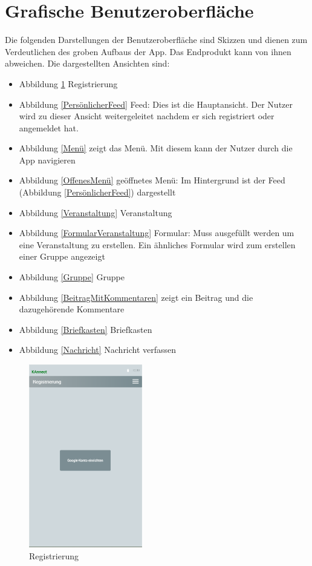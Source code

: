 \documentclass[parskip=full]{scrartcl}
\begin{document}
		
	\newpage
	\section{Grafische Benutzeroberfläche}
	Die folgenden Darstellungen der Benutzeroberfläche sind Skizzen und dienen zum Verdeutlichen des groben Aufbaus der \gls{App}. Das Endprodukt kann von ihnen abweichen.
	Die dargestellten Ansichten sind: 
	\begin{itemize}
		\item Abbildung \ref{Registrierung} Registrierung
		\item Abbildung \ref{PersönlicherFeed} \gls{Feed}: Dies ist die Hauptansicht. Der Nutzer wird zu dieser Ansicht weitergeleitet nachdem er sich registriert oder angemeldet hat.
		\item Abbildung \ref{Menü} zeigt das Menü. Mit diesem kann der Nutzer durch die \gls{App} navigieren
		\item Abbildung \ref{OffenesMenü} geöffnetes Menü: Im Hintergrund ist der \gls{Feed} (Abbildung \ref{PersönlicherFeed}) dargestellt
		\item Abbildung \ref{Veranstaltung} Veranstaltung
		\item Abbildung \ref{FormularVeranstaltung} Formular: Muss ausgefüllt werden um eine Veranstaltung zu erstellen. Ein ähnliches Formular wird zum erstellen einer Gruppe angezeigt
		\item Abbildung \ref{Gruppe} Gruppe
		\item Abbildung \ref{BeitragMitKommentaren} zeigt ein Beitrag und die dazugehörende Kommentare
		\item Abbildung \ref{Briefkasten} Briefkasten
		\item Abbildung \ref{Nachricht} Nachricht verfassen
	\end{itemize}
		
	
	\begin{figure}[H]
		\centering
		\includegraphics[height=8cm]{Registrierung}
		\caption{Registrierung}
		\label{Registrierung}
	\end{figure}
	
\end{document}
